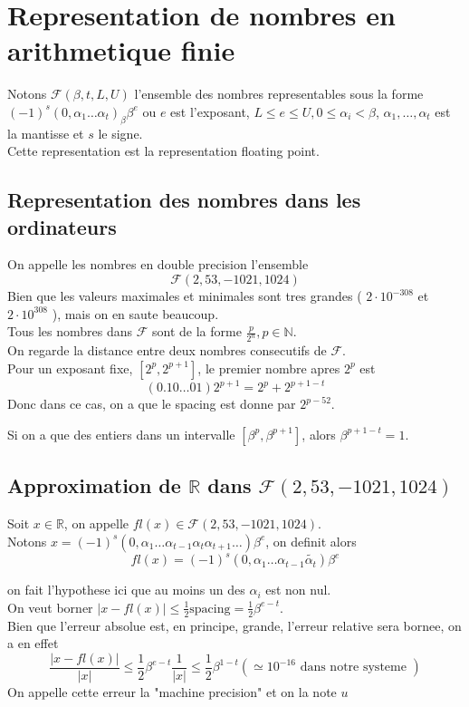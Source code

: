 \documentclass[../main.tex]{subfiles}
\begin{document}
\section{Representation de nombres en arithmetique finie}
Notons $ \mathcal{F}( \beta,t, L, U) $ l'ensemble des nombres representables sous la forme $ ( -1)^{s}( 0,\alpha_1\ldots\alpha_t)_{\beta} \beta^{e}$ ou $e$ est l'exposant, $L \leq e \leq U, 0 \leq \alpha_i < \beta$, $\alpha_1,\ldots,\alpha_t$ est la mantisse et $s$ le signe.\\
Cette representation est la representation floating point.
\subsection{Representation des nombres dans les ordinateurs}
On appelle les nombres en double precision l'ensemble
\[ 
\mathcal{F}( 2,53, -1021, 1024) 
\]
Bien que les valeurs maximales et minimales sont tres grandes ( $2 \cdot 10^{-308}$ et $ 2\cdot 10^{308}$ ), mais on en saute beaucoup.\\
Tous les nombres dans  $ \mathcal{F}$ sont de la forme $ \frac{p}{2^{n}}, p\in \mathbb{N}$.\\
On regarde la distance entre deux nombres consecutifs de $ \mathcal{F}$.\\
Pour un exposant fixe, $ [ 2^{p},2^{p+1}] $, le premier nombre apres $2^{p}$ est 
\[ 
	( 0.10\ldots 0 1) 2^{p+1} = 2^{p}+ 2^{p+1-t} 	
\]
Donc dans ce cas, on a que le spacing est donne par $ 2^{p-52}$.
\begin{rmq}
Si on a que des entiers dans un intervalle $ [ \beta^{p}, \beta^{p+1}] $, alors $\beta^{p+1-t}=1$.
\end{rmq}
\subsection{Approximation de $ \mathbb{R}$ dans $ \mathcal{F}( 2,53, -1021, 1024) $ }
Soit $ x\in \mathbb{R}$, on appelle $fl( x) \in \mathcal{F}( 2,53, -1021, 1024) $.\\
Notons $ x= ( -1)^{s}( 0, \alpha_1\ldots \alpha_{t-1} \alpha_t \alpha_{t+1} \ldots) \beta^{e}$, on definit alors
\[ 
	fl( x) = ( -1)^{s}( 0, \alpha_1\ldots \alpha_{t-1} \tilde{\alpha_t})  \beta^{e}
\]

on fait l'hypothese ici que au moins un des $\alpha_i$ est non nul.\\
On veut borner $|x-fl( x) | \leq \frac{1}{2}\textrm{spacing}= \frac{1}{2}\beta^{e-t}$.\\
Bien que l'erreur absolue est, en principe, grande, l'erreur relative sera bornee, on a en effet
\[ 
\frac{ |x-fl( x) |}{|x|} \leq \frac{1}{2}\beta^{e-t}\frac{1}{|x|} \leq \frac{1}{2} \beta^{1-t} ( \simeq 10^{-16 } \text{ dans notre systeme } ) 
\]
On appelle cette erreur la "machine precision" et on la note $u$ 
\end{document}
